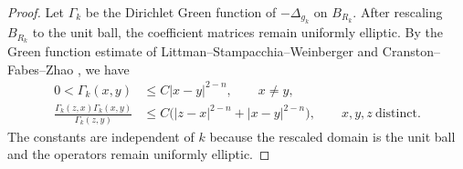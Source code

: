 \documentclass[11pt]{article}
\numberwithin{equation}{section}
\theoremstyle{remark}
\begin{document}
\begin{proof}
 Let $\Gamma_k$ be the Dirichlet Green function of $-\Delta_{g_k}$ on
 $B_{R_k}$.   After rescaling $B_{R_k}$ to the unit ball, the coefficient
matrices remain uniformly elliptic.  By the Green function estimate of
Littman--Stampacchia--Weinberger \cite{LittmanStampacchiaWeinberger} and
Cranston--Fabes--Zhao \cite[Theorem  3.1]{CranstonFabesZhao}, we have
{
\[
\begin{aligned}
 0<\Gamma_k(x,y)&\le C|x-y|^{2-n},\qquad x\ne y,\\
 \frac{\Gamma_k(z,x)\Gamma_k(x,y)}{\Gamma_k(z,y)}
 &\le C\bigl(|z-x|^{2-n}+|x-y|^{2-n}\bigr),
 \qquad x,y,z\ \text{distinct}.
\end{aligned}
\]
}
 The constants are independent of $k$ because the rescaled domain is the unit
ball and the operators remain uniformly elliptic.


\end{proof}
\end{document}
